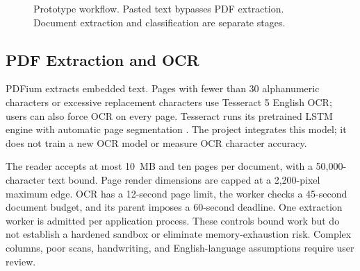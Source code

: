 \documentclass[conference,a4paper]{IEEEtran}
\begin{document}
\begin{figure}[t]
\centering
{}
\caption{Prototype workflow. Pasted text bypasses PDF extraction. Document extraction and classification are separate stages.}
\label{fig:architecture}
\end{figure}

\subsection{PDF Extraction and OCR}
PDFium extracts embedded text. Pages with fewer than 30 alphanumeric characters or excessive replacement characters use Tesseract 5 English OCR; users can also force OCR on every page. Tesseract runs its pretrained LSTM engine with automatic page segmentation \cite{tesseract}. The project integrates this model; it does not train a new OCR model or measure OCR character accuracy.

The reader accepts at most 10~MB and ten pages per document, with a 50,000-character text bound. Page render dimensions are capped at a 2,200-pixel maximum edge. OCR has a 12-second page limit, the worker checks a 45-second document budget, and its parent imposes a 60-second deadline. One extraction worker is admitted per application process. These controls bound work but do not establish a hardened sandbox or eliminate memory-exhaustion risk. Complex columns, poor scans, handwriting, and English-language assumptions require user review.
\end{document}
